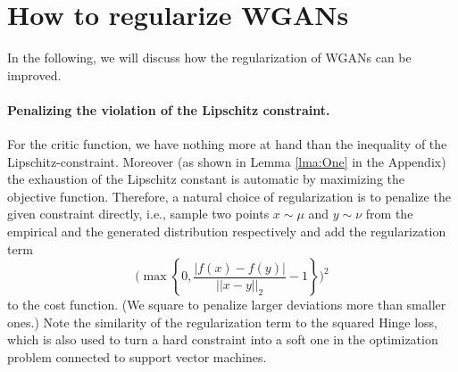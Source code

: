 \documentclass{article} %
\newcommand{\norm}[1]{||{#1}||_2}
\begin{document}
%


\section{How to regularize WGANs}\label{sec:proposal}

In the following, we will discuss how the regularization of WGANs can be improved.

\paragraph{Penalizing the violation of the Lipschitz constraint.}\label{sct:penalizingCorrectly}

For the critic function, we have nothing more at hand than the inequality of the Lipschitz-constraint. Moreover (as shown in Lemma \ref{lma:One} in the 
Appendix) the exhaustion of the Lipschitz constant is automatic by maximizing the objective function. Therefore, a natural choice of regularization is to penalize the given constraint directly, i.e., sample two points $x\sim \mu$ and $y \sim \nu$ from the empirical and the generated distribution respectively and add the regularization term 
\begin{equation}\label{eq:LP-simple}
\Big( \max \left \{ 0 , \frac{|f(x)-f(y)|}{\norm{x-y}} -1 \right \} \Big)^2
\end{equation}
to the cost function. (We square to penalize larger deviations more than smaller ones.)  Note the similarity of the regularization term to the squared Hinge loss, which is also used to turn a hard constraint into a soft one in the optimization problem connected to support vector machines. 
\end{document}
